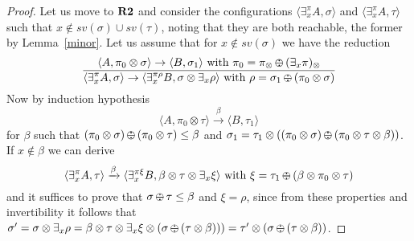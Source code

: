 \documentclass{llncs}
\def\odiv{\, {\ominus\hspace{-7.7pt} \div} \,}
\begin{document}
\begin{proof}
Let us  move to ${\bf R2}$ and consider the configurations 
$\langle \exists^\pi_x A, \sigma \rangle$  and
$\langle \exists^\pi_x A, \tau \rangle$
such that $x \not \in sv(\sigma) \cup sv(\tau)$, noting that
they are both reachable, the former by Lemma~\ref{minor}.
%
Let us assume that for $x \not \in sv(\sigma)$ we have the reduction
    $$\frac {\displaystyle \langle A, \pi_0 \otimes \sigma \rangle
    \to \langle B, \sigma_1 \rangle \text{ with } \pi_0 = \pi_\otimes \odiv (\exists_x \pi)_\otimes}
    {\displaystyle\langle \exists^{\pi}_x A,\sigma\rangle \to \langle 
    \exists^{\pi \rho}_x B, \sigma \otimes \exists_x \rho
    \rangle \text{ with } \rho = \sigma_1 \odiv (\pi_0 \otimes \sigma)} $$
%
Now by induction hypothesis
$$\langle A, \pi_0 \otimes \tau \rangle  \xrightarrow{\beta}
  \langle B, \tau_1 \rangle $$  for $\beta$ such that 
  $(\pi_0 \otimes \sigma) \odiv (\pi_ 0 \otimes \tau) \leq \beta$
  and $\sigma_1 = \tau_1 \otimes ((\pi_0 \otimes \sigma) \odiv (\pi_0 \otimes \tau \otimes \beta))$.
  If $x \not \in \beta$ we can derive
  $${\displaystyle\langle \exists^{\pi}_x A,\tau\rangle \xrightarrow{\beta} 
   \langle \exists^{\pi \xi}_x B, \beta \otimes  \tau \otimes \exists_x \xi
    \rangle \text{ with } \xi = \tau_1 \odiv (\beta \otimes \pi_0 \otimes \tau)}$$
and it suffices to prove that $\sigma \odiv \tau \leq \beta$ and $\xi = \rho$, 
since from these properties and invertibility it follows that
 $\sigma' = \sigma \otimes \exists_x \rho = \beta \otimes \tau \otimes \exists_x \xi \otimes (\sigma \odiv (\tau \otimes \beta))) = 
 \tau' \otimes (\sigma \odiv (\tau \otimes \beta))$.
  



\end{proof}
\end{document}
